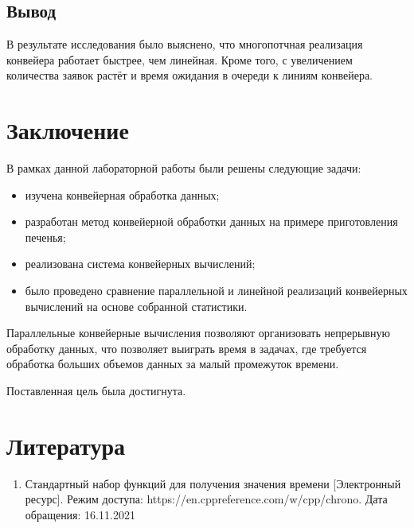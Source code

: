 \documentclass[12pt]{report}
\begin{document}
\section*{Вывод}

В результате исследования было выяснено, что многопотчная реализация конвейера работает быстрее, чем линейная. Кроме того, с увеличением количества заявок растёт и время ожидания в очереди к линиям конвейера.
\chapter*{Заключение}

В рамках данной лабораторной работы были решены следующие задачи:
\begin{itemize}
    \item изучена конвейерная обработка данных;
    \item разработан метод конвейерной обработки данных на примере приготовления печенья;
	\item реализована система конвейерных вычислений;
	\item было проведено сравнение параллельной и линейной реализаций конвейерных вычислений на основе собранной статистики.
\end{itemize}

Параллельные конвейерные вычисления позволяют организовать непрерывную обработку данных, что позволяет выиграть время в задачах, где требуется обработка больших объемов данных за малый промежуток времени.

Поставленная цель была достигнута.


\chapter*{Литература}
\begin{enumerate}
	\item Стандартный набор функций для получения значения времени [Электронный ресурс]. Режим доступа: https://en.cppreference.com/w/cpp/chrono. Дата обращения: 16.11.2021
	
\end{enumerate}
\end{document}

